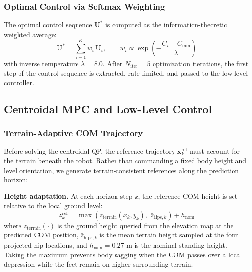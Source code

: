\documentclass[letterpaper, 10 pt, conference]{ieeeconf}  %
\begin{document}
\subsubsection{Optimal Control via Softmax Weighting}
The optimal control sequence $\mathbf{U}^*$ is computed as the information-theoretic weighted average:
\begin{equation}
\mathbf{U}^* = \sum_{i=1}^{K} w_i\, \mathbf{U}_i, \qquad w_i \propto \exp\!\left(-\frac{C_i - C_{\min}}{\lambda}\right) \label{eq:softmax}
\end{equation}
with inverse temperature $\lambda = 8.0$. After $N_{\text{iter}}=5$ optimization iterations, the first step of the control sequence is extracted, rate-limited, and passed to the low-level controller.
\subsection{Centroidal MPC and Low-Level Control}
\label{sec:mpc}

\subsubsection{Terrain-Adaptive COM Trajectory}
\label{sec:com_adapt}
Before solving the centroidal QP, the reference trajectory $\mathbf{x}_k^{\text{ref}}$ must account for the terrain beneath the robot. Rather than commanding a fixed body height and level orientation, we generate terrain-consistent references along the prediction horizon:

\textbf{Height adaptation.} At each horizon step $k$, the reference COM height is set relative to the local ground level:
\begin{equation}
z_k^{\text{ref}} = \max\!\left(z_{\text{terrain}}(x_k, y_k),\; \bar{z}_{\text{hips},k}\right) + h_{\text{nom}} \label{eq:com_height}
\end{equation}
where $z_{\text{terrain}}(\cdot)$ is the ground height queried from the elevation map at the predicted COM position, $\bar{z}_{\text{hips},k}$ is the mean terrain height sampled at the four projected hip locations, and $h_{\text{nom}} = 0.27$ m is the nominal standing height. Taking the maximum prevents body sagging when the COM passes over a local depression while the feet remain on higher surrounding terrain.
\end{document}
